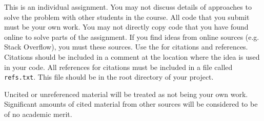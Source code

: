 \documentclass{csse4400}
\begin{document}
This is an individual assignment.
You may not discuss details of approaches to solve the problem with other students in the course.
All code that you submit must be your own work.
You may not directly copy code that you have found online to solve parts of the assignment.
If you find ideas from online sources (e.g. Stack Overflow), you must  these sources.
Use the  for citations and references.
Citations should be included in a comment at the location where the idea is used in your code.
All references for citations must be included in a file called \texttt{refs.txt}.
This file should be in the root directory of your project.

Uncited or unreferenced material will be treated as not being your own work.
Significant amounts of cited material from other sources will be considered to be of no academic merit.






\end{document}
